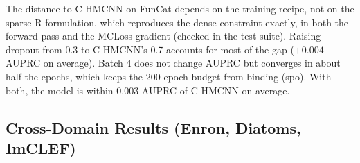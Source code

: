 \documentclass[preprint,12pt]{elsarticle}
\begin{document}
The distance to C-HMCNN on FunCat depends on the training recipe,
not on the sparse R formulation, which reproduces the dense constraint
exactly, in both the forward pass and the MCLoss gradient (checked in
the test suite).  Raising dropout from 0.3 to C-HMCNN's 0.7 accounts
for most of the gap ($+0.004$ AUPRC on average).  Batch 4 does not
change AUPRC but converges in about half the epochs, which keeps the
200-epoch budget from binding (spo).  With both, the model is within
0.003 AUPRC of C-HMCNN on average.

\subsection{Cross-Domain Results (Enron, Diatoms, ImCLEF)}
\label{sec:others}

\begin{table}[htbp]
\centering
\caption{AUPRC on the cross-domain datasets: email classification
(Enron), microscopy (Diatoms) and medical imaging (ImCLEF), all with
pre-extracted ARFF features.  Ours: MLP trained with BCE, the hinge
penalty, or MCLoss through the sparse R, reconciled at inference, plus
\textbf{Ours + H-MLCL+H-KNN} (the validation-selected blend, paired rerun;
AUPRC without \texttt{DepthCal}, F1 in the note), mean
$\pm$ std over three seeds.  These releases ship no validation partition,
so 20\% of the training file is held out for early stopping and the
threshold, and merged back for the refit; the test split is used once.
Published baselines from their papers.
\textbf{Bold}: best.}
\label{tab:others}
\end{table}
\end{document}
